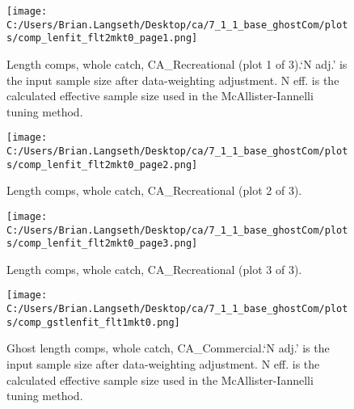 \documentclass[11pt,
  english,
  letterpaper,
]{article}
\begin{document}
\tagmcend\tagstructend


\begin{figure}
\centering
\texttt{[image: C:/Users/Brian.Langseth/Desktop/ca/7\_1\_1\_base\_ghostCom/plots/comp\_lenfit\_flt2mkt0\_page1.png]}
\caption{Length comps, whole catch, CA\_Recreational (plot 1 of 3).`N adj.' is the input sample size after data-weighting adjustment. N eff. is the calculated effective sample size used in the McAllister-Iannelli tuning method.\label{fig:comp_lenfit_flt2mkt0_page1}}
\end{figure}

\tagmcend\tagstructend


\begin{figure}
\centering
\texttt{[image: C:/Users/Brian.Langseth/Desktop/ca/7\_1\_1\_base\_ghostCom/plots/comp\_lenfit\_flt2mkt0\_page2.png]}
\caption{Length comps, whole catch, CA\_Recreational (plot 2 of 3).\label{fig:comp_lenfit_flt2mkt0_page2}}
\end{figure}

\tagmcend\tagstructend


\begin{figure}
\centering
\texttt{[image: C:/Users/Brian.Langseth/Desktop/ca/7\_1\_1\_base\_ghostCom/plots/comp\_lenfit\_flt2mkt0\_page3.png]}
\caption{Length comps, whole catch, CA\_Recreational (plot 3 of 3).\label{fig:comp_lenfit_flt2mkt0_page3}}
\end{figure}

\tagmcend\tagstructend


\begin{figure}
\centering
\texttt{[image: C:/Users/Brian.Langseth/Desktop/ca/7\_1\_1\_base\_ghostCom/plots/comp\_gstlenfit\_flt1mkt0.png]}
\caption{Ghost length comps, whole catch, CA\_Commercial.`N adj.' is the input sample size after data-weighting adjustment. N eff. is the calculated effective sample size used in the McAllister-Iannelli tuning method.\label{fig:comp_gstlenfit_flt1mkt0}}
\end{figure}

\tagmcend\tagstructend

\clearpage
\end{document}
